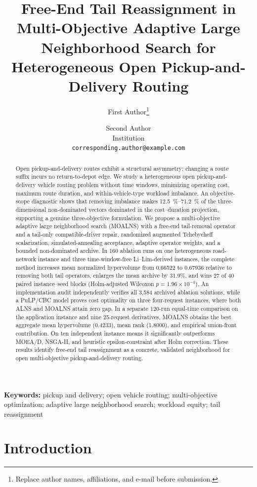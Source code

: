 \documentclass[11pt,a4paper]{article}
\title{Free-End Tail Reassignment in Multi-Objective Adaptive Large
Neighborhood Search for Heterogeneous Open Pickup-and-Delivery Routing}
\author{First Author\thanks{Replace author names, affiliations, and e-mail before submission.}
\and Second Author\\Institution\\
\texttt{corresponding.author@example.com}}
\date{}
\newcommand{\MOALNS}{MOALNS}
\begin{document}
\maketitle

\begin{abstract}
Open pickup-and-delivery routes exhibit a structural asymmetry: changing a
route suffix incurs no return-to-depot edge. We study a heterogeneous open
pickup-and-delivery vehicle routing problem without time windows, minimizing
operating cost, maximum route duration, and within-vehicle-type workload
imbalance. An objective-scope diagnostic shows that removing imbalance makes
\SIrange{12.5}{71.2}{\percent} of the three-dimensional non-dominated vectors
dominated in the cost--duration projection, supporting a genuine
three-objective formulation. We propose a multi-objective adaptive large
neighborhood search (\MOALNS{}) with a free-end tail-removal operator and a
tail-only compatible-driver repair, randomized augmented Tchebycheff
scalarization, simulated-annealing acceptance, adaptive operator weights, and
a bounded non-dominated archive. In 160 ablation runs on one heterogeneous
road-network instance and three time-window-free Li--Lim-derived instances,
the complete method increases mean normalized hypervolume from 0.66522 to
0.67936 relative to removing both tail operators, enlarges the mean archive by
31.9\%, and wins 27 of 40 paired instance--seed blocks
(Holm-adjusted Wilcoxon $p=1.96\times10^{-4}$). An implementation audit
independently verifies all 3,584 archived ablation solutions, while a PuLP/CBC
model proves cost optimality on three four-request instances, where both ALNS
and \MOALNS{} attain zero gap. In a separate 120-run equal-time comparison on
the application instance and nine 25-request derivatives, \MOALNS{} obtains
the best aggregate mean hypervolume (0.4233), mean rank (1.8000), and empirical
union-front contribution. On ten independent instance means it significantly
outperforms MOEA/D, NSGA-II, and heuristic epsilon-constraint after Holm
correction. These results identify free-end tail reassignment as a concrete,
validated neighborhood for open multi-objective pickup-and-delivery routing.
\end{abstract}

\noindent\textbf{Keywords:} pickup and delivery; open vehicle routing;
multi-objective optimization; adaptive large neighborhood search; workload
equity; tail reassignment

\section{Introduction}
\end{document}

